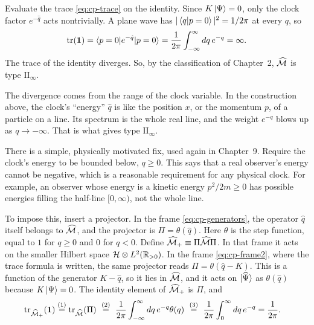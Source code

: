 Evaluate the trace \eqref{eq:cp-trace} on the identity. Since $K\ket\Psi=0$, only the clock factor $e^{-\hat q}$
acts nontrivially. A plane wave has $|\braket{q|p=0}|^2=1/2\pi$ at every $q$, so
\[
\operatorname{tr}(\mathbf{1}) = \braket{p=0|e^{-\hat q}|p=0} = \frac{1}{2\pi}\int_{-\infty}^\infty dq\,e^{-q} = \infty .
\]
The trace of the identity diverges. So, by the classification of Chapter~2, $\widehat{\mathcal{M}}$ is type
$\mathrm{II}_\infty$.

The divergence comes from the range of the clock variable. In the construction above, the clock's
``energy'' $\hat q$ is like the position $x$, or the momentum $p$, of a particle on a line. Its spectrum is the
whole real line, and the weight $e^{-q}$ blows up as $q\to-\infty$. That is what gives type
$\mathrm{II}_\infty$.

There is a simple, physically motivated fix, used again in Chapter~9. Require the clock's energy to be bounded
below, $q\ge0$. This says that a real observer's energy cannot be negative, which is a reasonable requirement
for any physical clock. For example, an observer whose energy is a kinetic energy $p^2/2m\ge0$ has possible
energies filling the half-line $[0,\infty)$, not the whole line.

To impose this, insert a projector. In the frame \eqref{eq:cp-generators}, the operator $\hat q$ itself
belongs to $\widehat{\mathcal{M}}$, and the projector is $\Pi=\theta(\hat q)$. Here $\theta$ is the step function, equal to
$1$ for $q\ge0$ and $0$ for $q<0$. Define $\widehat{\mathcal{M}}_+\equiv\Pi\widehat{\mathcal{M}}\Pi$. In that frame it acts on the
smaller Hilbert space $\mathcal{H}\otimes L^2(\mathbb R_{>0})$. In the frame \eqref{eq:cp-frame2}, where the trace formula
is written, the same projector reads $\Pi=\theta(\hat q-K)$. This is a function of the generator $K-\hat q$, so
it lies in $\widehat{\mathcal{M}}$, and it acts on $\ket{\widehat\Psi}$ as $\theta(\hat q)$ because $K\ket\Psi=0$. The
identity element of $\widehat{\mathcal{M}}_+$ is $\Pi$, and
\begin{align}
\operatorname{tr}_{\widehat{\mathcal{M}}_+}(\mathbf{1})
&\overset{(1)}{=} \operatorname{tr}_{\widehat{\mathcal{M}}}(\Pi)
\ \overset{(2)}{=}\ \frac{1}{2\pi}\int_{-\infty}^\infty dq\,e^{-q}\theta(q)
\ \overset{(3)}{=}\ \frac{1}{2\pi}\int_0^\infty dq\,e^{-q} = \frac{1}{2\pi} . \notag
\end{align}
\quad
{}\quad
{}

